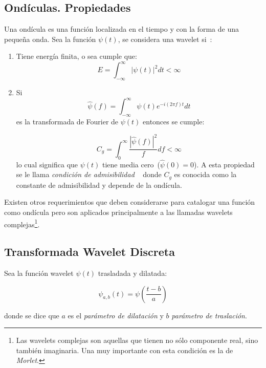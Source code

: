 \subsection{Ond\'iculas. Propiedades}
Una ond\'icula es una funci\'on localizada en el tiempo y con la forma de una peque\~na onda. Sea la funci\'on $\psi(t)$, se considera una wavelet si~\cite[p.10]{addison2017illustrated}:
\begin{enumerate}
\item Tiene energ\'ia finita, o sea cumple que:
	\begin{equation}\label{E:energy}
	E = \int_{-\infty}^{\infty} |\psi(t)|^{2} dt < \infty
	\end{equation}
	
\item Si 
	\begin{equation}\label{E:transwav}
	\hat{\psi}(f) = \int_{-\infty}^{\infty} \psi(t) e^{-i(2\pi f) t} dt
	\end{equation}
	es la transformada de Fourier de $\psi(t)$ entonces se cumple:
	
		\begin{equation}\label{E:admisibilidad}
		C_g = \int_{0}^{\infty} \dfrac{|\hat{\psi}(f)|^2}{f} df < \infty
		\end{equation}
	lo cual significa que $\psi(t)$ tiene media cero~($\hat{\psi}(0)=0$). A esta propiedad se le llama \emph{condici\'on de admisibilidad} ~\cite[p.11]{debnath2002wavelet} donde $C_g$ es conocida como la constante de admisibilidad y depende de la ond\'icula. 
\end{enumerate}

Existen otros requerimientos que deben considerarse para catalogar una funci\'on como ond\'icula pero son aplicados principalmente a las llamadas wavelets complejas\footnote{Las wavelets complejas son aquellas que tienen no s\'olo componente real, sino tambi\'en imaginaria. Una muy importante con esta condici\'on es la de \emph{Morlet}\cite[secci\'on 2.11]{addison2017illustrated}.}.


\subsection{Transformada Wavelet Discreta}
Sea la funci\'on wavelet $\psi(t)$ trasladada y dilatada:

$$ \psi_{a,b}(t) = \psi(\dfrac{t-b}{a})  $$

donde se dice que $a$ es el \emph{par\'ametro de dilataci\'on} y $b$ \emph{par\'ametro de traslaci\'on}. 


